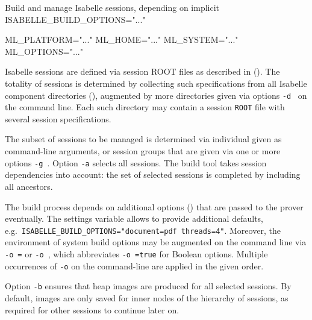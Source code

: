 \begin{isabellebody}
\begin{isamarkuptext}
\begin{ttbox}
  Build and manage Isabelle sessions, depending on implicit
  ISABELLE_BUILD_OPTIONS="..."

  ML_PLATFORM="..."
  ML_HOME="..."
  ML_SYSTEM="..."
  ML_OPTIONS="..."
\end{ttbox}

  \medskip Isabelle sessions are defined via session ROOT files as
  described in ().  The totality of sessions
  is determined by collecting such specifications from all Isabelle
  component directories (), augmented by more
  directories given via options \verb|-d|~ on the
  command line.  Each such directory may contain a session
  \texttt{ROOT} file with several session specifications.

  \medskip The subset of sessions to be managed is determined via
  individual  given as command-line arguments, or
  session groups that are given via one or more options \verb|-g|~.  Option \verb|-a| selects all sessions.
  The build tool takes session dependencies into account: the set of
  selected sessions is completed by including all ancestors.

  \medskip The build process depends on additional options
  () that are passed to the prover
  eventually.  The settings variable \hyperlink{setting.ISABELLE-BUILD-OPTIONS}{\mbox{}} allows to provide additional defaults, e.g.\
  \texttt{ISABELLE_BUILD_OPTIONS="document=pdf threads=4"}. Moreover,
  the environment of system build options may be augmented on the
  command line via \verb|-o|~\verb|=| or \verb|-o|~, which
  abbreviates \verb|-o|~\isa{{\isaliteral{22}{\isachardoublequote}}name{\isaliteral{22}{\isachardoublequote}}}\verb|=true| for
  Boolean options.  Multiple occurrences of \verb|-o| on the
  command-line are applied in the given order.

  \medskip Option \verb|-b| ensures that heap images are
  produced for all selected sessions.  By default, images are only
  saved for inner nodes of the hierarchy of sessions, as required for
  other sessions to continue later on.


\end{isamarkuptext}
\end{isabellebody}
